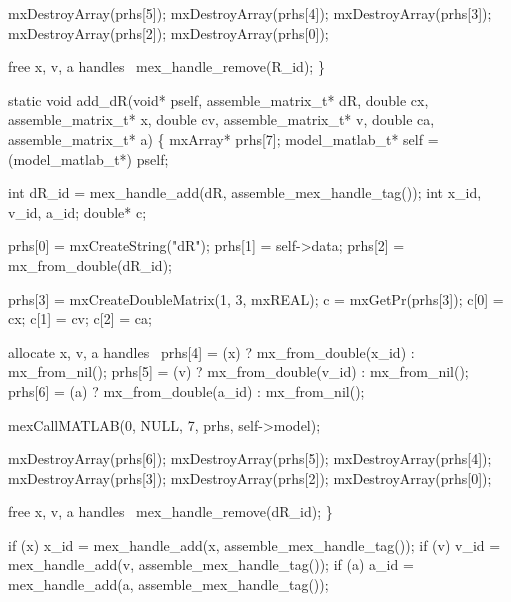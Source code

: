     mxDestroyArray(prhs[5]);
    mxDestroyArray(prhs[4]);
    mxDestroyArray(prhs[3]);
    mxDestroyArray(prhs[2]);
    mxDestroyArray(prhs[0]);

    \LA{}free x, v, a handles~{\nwtagstyle{}}\RA{}
    mex_handle_remove(R_id);
\}

\nwendcode{}\nwdocspar

\nwenddocs{}\plusendmoddef
static void add_dR(void* pself, assemble_matrix_t* dR,
                   double cx, assemble_matrix_t* x,
                   double cv, assemble_matrix_t* v,
                   double ca, assemble_matrix_t* a)
\{
    mxArray* prhs[7];
    model_matlab_t* self = (model_matlab_t*) pself;

    int dR_id = mex_handle_add(dR, assemble_mex_handle_tag());
    int x_id, v_id, a_id;
    double* c;

    prhs[0] = mxCreateString("dR");
    prhs[1] = self->data;
    prhs[2] = mx_from_double(dR_id);

    prhs[3] = mxCreateDoubleMatrix(1, 3, mxREAL);
    c = mxGetPr(prhs[3]);
    c[0] = cx;
    c[1] = cv;
    c[2] = ca;

    \LA{}allocate x, v, a handles~{\nwtagstyle{}}\RA{}
    prhs[4] = (x) ? mx_from_double(x_id) : mx_from_nil();
    prhs[5] = (v) ? mx_from_double(v_id) : mx_from_nil();
    prhs[6] = (a) ? mx_from_double(a_id) : mx_from_nil();

    mexCallMATLAB(0, NULL, 7, prhs, self->model); 

    mxDestroyArray(prhs[6]);
    mxDestroyArray(prhs[5]);
    mxDestroyArray(prhs[4]);
    mxDestroyArray(prhs[3]);
    mxDestroyArray(prhs[2]);
    mxDestroyArray(prhs[0]);

    \LA{}free x, v, a handles~{\nwtagstyle{}}\RA{}
    mex_handle_remove(dR_id);
\}

\nwendcode{}\nwdocspar

\nwenddocs{}\endmoddef
if (x) x_id = mex_handle_add(x, assemble_mex_handle_tag());
if (v) v_id = mex_handle_add(v, assemble_mex_handle_tag());
if (a) a_id = mex_handle_add(a, assemble_mex_handle_tag());
\nwendcode{}\nwdocspar


